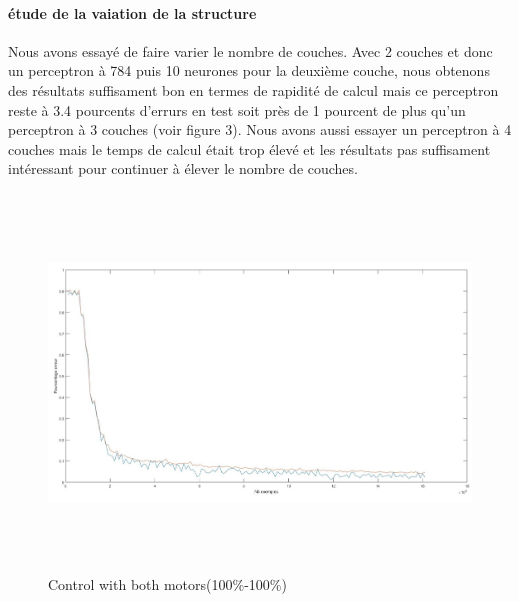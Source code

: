 \documentclass[a4paper,twoside]{report}
\begin{document}
\newpage
\paragraph{étude de la vaiation de la structure}
Nous avons essayé de faire varier le nombre de couches. Avec 2 couches et donc un perceptron à 784 puis 10 neurones pour la deuxième couche, nous obtenons des résultats suffisament bon en termes de rapidité de calcul mais ce perceptron reste à 3.4 pourcents d'errurs en test soit près de 1 pourcent de plus qu'un perceptron à 3 couches (voir figure 3). Nous avons aussi essayer un perceptron à 4 couches mais le temps de calcul était trop élevé et les résultats pas suffisament intéressant pour continuer à élever le nombre de couches. 

\begin{figure}[!h]
	\begin{center}
		\includegraphics[width=17cm,height=10cm]{Images/courbes2couches.jpg} 
		\caption{Control with both motors(100$\%$-100$\%$)} 
	\end{center}
\end{figure}
\end{document}
